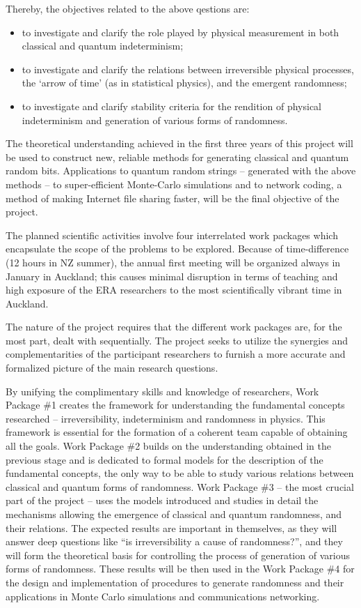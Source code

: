 \documentclass[12pt]{article}
\begin{document}
Thereby, the objectives related to the above qestions are:
\begin{itemize}
\item to investigate and clarify the role played by physical measurement in both classical and quantum
indeterminism;
\item to investigate and clarify the relations between irreversible physical processes, the `arrow of time' (as in statistical physics), and the emergent randomness;
\item to investigate and clarify stability criteria for the rendition of physical indeterminism and generation of various forms of randomness.
\end{itemize}


The theoretical understanding achieved in the first three years of this project will be used to
construct new, reliable  methods for generating classical and quantum random bits.
Applications to quantum random strings --
generated with the above methods -- to super-efficient Monte-Carlo simulations and to network coding, a method of making Internet file sharing faster, will be the final objective of the project.

The planned scientific activities involve four interrelated work packages which encapsulate the scope of the problems to be explored. Because of time-difference (12 hours in NZ summer),
the annual first meeting will be organized always in January in Auckland; this causes minimal disruption in terms of teaching and high exposure of the ERA researchers to the most scientifically vibrant time in Auckland.

The nature of the project requires that the different work packages are, for the most part, dealt with sequentially.
The project seeks to utilize the synergies and complementarities of the participant researchers to furnish a more accurate and formalized
picture of  the main research questions.

By unifying the complimentary skills and knowledge of researchers,  Work Package \#1 creates the framework for  understanding the fundamental concepts researched -- irreversibility, indeterminism and
 randomness in physics. This framework is essential for the formation of a coherent team capable of obtaining all the goals.
 Work Package \#2 builds on the understanding obtained in the previous stage
 and is dedicated to formal models for the description of the fundamental concepts, the only way to be able to study various relations between classical and quantum forms of randomness. Work Package \#3 -- the most crucial part of the project -- uses
 the models introduced and studies in detail the mechanisms allowing the emergence of  classical and quantum  randomness, and their relations. The expected results are important in themselves, as they will answer deep questions like ``is irreversibility a cause of randomness?'', and they will form the
 theoretical basis for controlling the process of generation of various forms of randomness. These results will be then used in the Work Package \#4 for the
 design and implementation of procedures to generate randomness and their
 applications in Monte Carlo simulations and communications networking.
\end{document}
